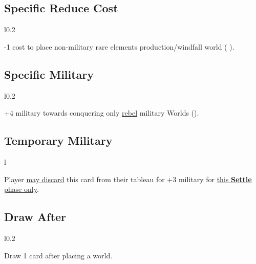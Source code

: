 \documentclass[letterpaper,landscape,twocolumn,8pt]{extarticle}
\newcommand{\inline}[1]{\scalerel*{#1}{M}}
\begin{document}
\begin{minipage}[t]{\calc{1/3}\columnwidth}
\RaggedRight{}
\setlength{\intextsep}{0pt}%

\subsection*{Specific Reduce Cost}
\begin{wrapfigure}{l}{0.2\columnwidth}
    
\end{wrapfigure}

-1 cost to place non-military rare elements production/windfall world
\smallbreak{}
(\inline{}
\inline{}).
\subsection*{Specific Military}
\begin{wrapfigure}{l}{0.2\columnwidth}
    

\end{wrapfigure}

+4 military towards conquering only \underline{rebel} military Worlds
(\inline{}).
\subsection*{Temporary Military}
\begin{wrapfigure}{l}{\columnwidth}
    
\end{wrapfigure}

Player \underline{may discard} this card from their tableau for +3 military for
\underline{this \textbf{Settle} phase only}.
\subsection*{Draw After}
\begin{wrapfigure}{l}{0.2\columnwidth}
    
\end{wrapfigure}

Draw 1 card after placing a world.

\end{minipage}
\end{document}
